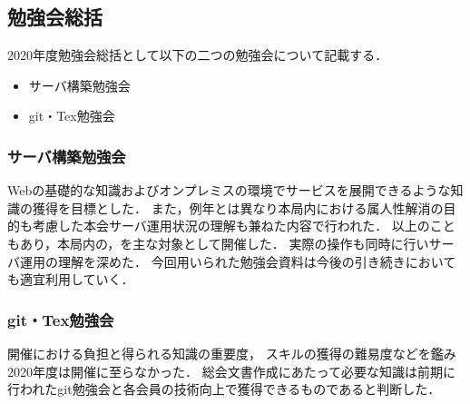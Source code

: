 \subsection*{勉強会総括}


2020年度勉強会総括として以下の二つの勉強会について記載する．
\begin{itemize}
    \item サーバ構築勉強会
    \item git・Tex勉強会
\end{itemize}

\subsubsection*{サーバ構築勉強会}
Webの基礎的な知識およびオンプレミスの環境でサービスを展開できるような知識の獲得を目標とした．
また，例年とは異なり本局内における属人性解消の目的も考慮した本会サーバ運用状況の理解も兼ねた内容で行われた．
以上のこともあり，本局内の\firstGrade{}，\secondGrade{}を主な対象として開催した．
実際の操作も同時に行いサーバ運用の理解を深めた．
今回用いられた勉強会資料は今後の引き続きにおいても適宜利用していく．

\subsubsection*{git・Tex勉強会}
開催における負担と得られる知識の重要度，
スキルの獲得の難易度などを鑑み2020年度は開催に至らなかった．
総会文書作成にあたって必要な知識は前期に行われたgit勉強会と各会員の技術向上で獲得できるものであると判断した．
